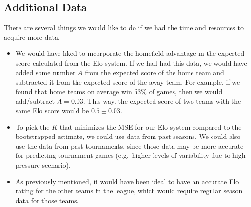 \documentclass{article}
\begin{document}
\subsection{Additional Data}
There are several things we would like to do if we had the time and resources to acquire more data.
\begin{itemize}
    \item We would have liked to incorporate the homefield advantage in the expected score calculated from the Elo system. If we had had this data, we would have added some number $A$ from the expected score of the home team and subtracted it from the expected score of the away team. For example, if we found that home teams on average win 53\% of games, then we would add/subtract $A=0.03$. This way, the expected score of two teams with the same Elo score would be $0.5 \pm 0.03$. 
    \item To pick the $K$ that minimizes the MSE for our Elo system compared to the bootstrapped estimate, we could use data from past seasons. We could also use the data from past tournaments, since those data may be more accurate for predicting tournament games (e.g.\ higher levels of variability due to high pressure scenario).
    \item As previously mentioned, it would have been ideal to have an accurate Elo rating for the other teams in the league, which would require regular season data for those teams.
\end{itemize}




\newpage


\end{document}
